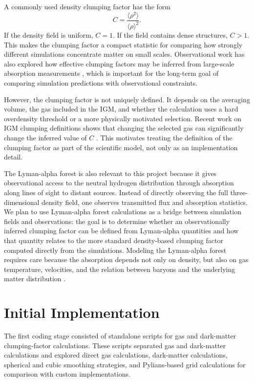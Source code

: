 \documentclass[
    aps,
    prd,
    preprint,
    onecolumn,
    nofootinbib,
    groupedaddress
]{revtex4-2}
\begin{document}
A commonly used density clumping factor has the form
\begin{equation}
    C = \frac{\langle \rho^2 \rangle}{\langle \rho \rangle^2}.
\end{equation}
If the density field is uniform, \(C=1\). If the field contains dense structures, \(C>1\). This makes the clumping factor a compact statistic for comparing how strongly different simulations concentrate matter on small scales. Observational work has also explored how effective clumping factors may be inferred from large-scale absorption measurements \cite{davies2024}, which is important for the long-term goal of comparing simulation predictions with observational constraints.

However, the clumping factor is not uniquely defined. It depends on the averaging volume, the gas included in the IGM, and whether the calculation uses a hard overdensity threshold or a more physically motivated selection. Recent work on IGM clumping definitions shows that changing the selected gas can significantly change the inferred value of \(C\) \cite{oku2025}. This motivates treating the definition of the clumping factor as part of the scientific model, not only as an implementation detail.

The Lyman-alpha forest is also relevant to this project because it gives observational access to the neutral hydrogen distribution through absorption along lines of sight to distant sources. Instead of directly observing the full three-dimensional density field, one observes transmitted flux and absorption statistics. We plan to use Lyman-alpha forest calculations as a bridge between simulation fields and observations: the goal is to determine whether an observationally inferred clumping factor can be defined from Lyman-alpha quantities and how that quantity relates to the more standard density-based clumping factor computed directly from the simulations. Modeling the Lyman-alpha forest requires care because the absorption depends not only on density, but also on gas temperature, velocities, and the relation between baryons and the underlying matter distribution \cite{sinigaglia2021}.

\section{Initial Implementation}

The first coding stage consisted of standalone scripts for gas and dark-matter clumping-factor calculations. These scripts separated gas and dark-matter calculations and explored direct gas calculations, dark-matter calculations, spherical and cubic smoothing strategies, and Pylians-based grid calculations for comparison with custom implementations.
\end{document}
